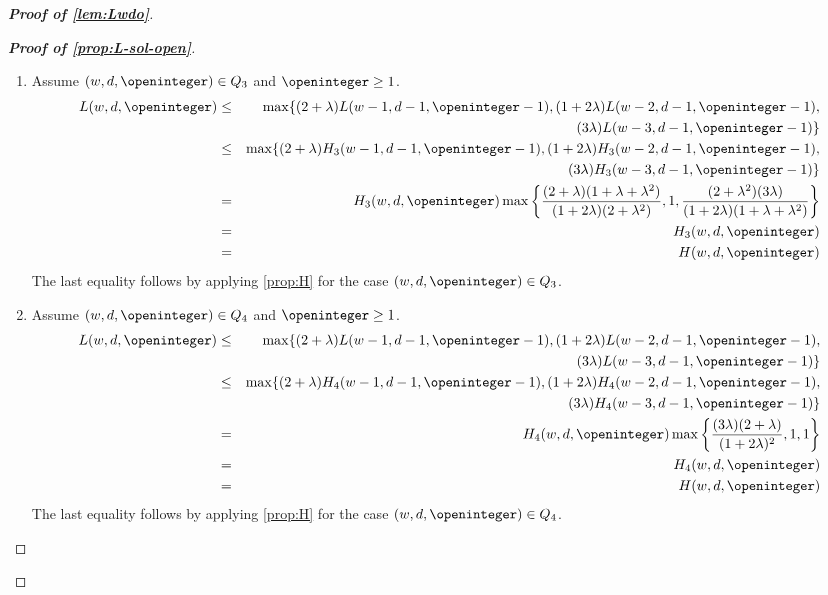 \begin{proof}[\textbf{Proof of \cref{lem:Lwdo}}]
\begin{proof}[\textbf{Proof of \cref{prop:L-sol-open}}]
\begin{enumerate}[label=\textbf{Case \arabic*:}, itemindent=*, leftmargin=0em]
\item Assume $(w, d, \openinteger)\in Q_3$ and $\openinteger \ge 1$.
\begin{eqnarray*}
L(w, d, \openinteger) & \leq & \max\{(2+\lambda)L(w-1, d-1, \openinteger-1), (1+2\lambda)L(w-2, d-1, \openinteger-1), \\
& & (3\lambda)L(w-3, d-1, \openinteger-1)\}\\
& \le & \max\{(2+\lambda)H_3(w-1, d-1, \openinteger-1), (1+2\lambda)H_3(w-2, d-1, \openinteger-1), \\
& & (3\lambda)H_3(w-3, d-1, \openinteger-1)\}\\
& = & H_3(w, d, \openinteger)\max\left\{\frac{(2+\lambda)(1+\lambda+\lambda^2)}{(1+2\lambda)(2+\lambda^2)}, 1, \frac{(2+\lambda^2)(3\lambda)}{(1+2\lambda)(1+\lambda+\lambda^2)} \right\}\\
& = & H_3(w, d, \openinteger)\\
& = & H(w, d, \openinteger)\\
\end{eqnarray*}
The last equality follows by applying \cref{prop:H} for the case $(w, d,\openinteger)\in Q_3$.

\item Assume $(w, d, \openinteger)\in Q_4$ and $\openinteger \ge 1$.
\begin{eqnarray*}
L(w, d, \openinteger) & \leq & \max\{(2+\lambda)L(w-1, d-1, \openinteger-1), (1+2\lambda)L(w-2, d-1, \openinteger-1), \\
& & (3\lambda)L(w-3, d-1, \openinteger-1)\}\\
& \le & \max\{(2+\lambda)H_4(w-1, d-1, \openinteger-1), (1+2\lambda)H_4(w-2, d-1, \openinteger-1), \\
& & (3\lambda)H_4(w-3, d-1, \openinteger-1)\}\\
& = & H_4(w, d, \openinteger)\max\left\{\frac{(3\lambda)(2+\lambda)}{(1+2\lambda)^2}, 1, 1 \right\}\\
& = & H_4(w, d, \openinteger)\\
& = & H(w, d, \openinteger)
\end{eqnarray*}
The last equality follows by applying \cref{prop:H} for the case $(w, d,\openinteger)\in Q_4$.


\end{enumerate}
\end{proof}
\end{proof}
